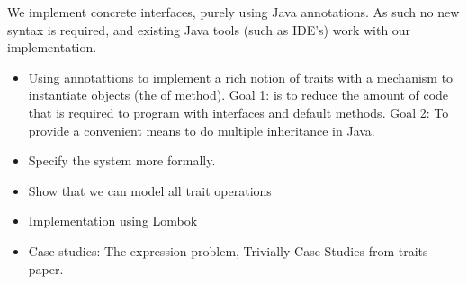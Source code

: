 We implement concrete interfaces, purely using Java annotations. As such 
no new syntax is required, and existing Java tools (such as IDE's) work 
with our implementation. 

\begin{itemize}

\item Using annotattions to implement a rich notion of traits with a
mechanism to instantiate objects (the of method). Goal 1: is to reduce
the amount of code that is required to program with interfaces and default
methods. Goal 2: To provide a convenient means to do multiple inheritance
in Java.

\item Specify the system more formally.

\item Show that we can model all trait operations

\item Implementation using Lombok

\item Case studies: The expression problem, Trivially
Case Studies from traits paper.

\end{itemize}
